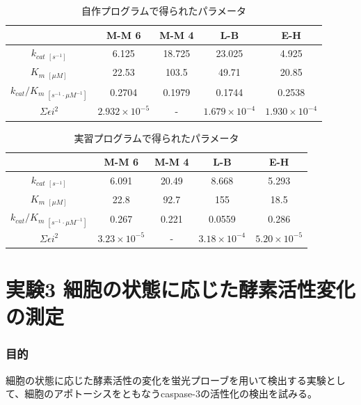 \documentclass[a4paper,papersize,dvipdfmx]{jsarticle}
\begin{document}
\begin{table}[H]
\begin{center}
\begin{tabular}{|c|c|c|c|c|}
\hline
& M-M 6     & M-M 4     & L-B       & E-H       \\ \hline
$k_{cat} \ _{[s^{-1}]}$ & 6.125 & 18.725 & 23.025 & 4.925 \\ \hline
$K_m \ _{[\mu M]}$ & 22.53 & 103.5 & 49.71 & 20.85 \\ \hline
$k_{cat}/K_m \ _{[s^{-1} \cdot \mu M^{-1}]}$   & 0.2704 & 0.1979 & 0.1744 & 0.2538 \\ \hline
$\Sigma \epsilon i^2$    & $2.932 \times 10^{-5}$ & - & $1.679 \times 10^{-4}$ & $1.930 \times 10^{-4}$ \\ \hline
\end{tabular}
\caption{自作プログラムで得られたパラメータ}
\end{center}
\end{table}

\begin{table}[H]
\begin{center}
\begin{tabular}{|c|c|c|c|c|}
\hline
& M-M 6     & M-M 4     & L-B       & E-H       \\ \hline
$k_{cat} \ _{[s^{-1}]}$ & 6.091 & 20.49 & 8.668 & 5.293 \\ \hline
$K_m \ _{[\mu M]}$ & 22.8 & 92.7 & 155 & 18.5 \\ \hline
$k_{cat}/K_m \ _{[s^{-1} \cdot \mu M^{-1}]}$   & 0.267& 0.221 & 0.0559 & 0.286 \\ \hline
$\Sigma \epsilon i^2$    & $3.23 \times 10^{-5}$ & - & $3.18 \times 10^{-4}$ & $5.20 \times 10^{-5}$ \\ \hline
\end{tabular}
\caption{実習プログラムで得られたパラメータ}
\end{center}
\end{table}




\part*{実験3 細胞の状態に応じた酵素活性変化の測定}

\section*{目的}
細胞の状態に応じた酵素活性の変化を蛍光プローブを用いて検出する実験として、細胞のアポトーシスをともなうcaspase-3の活性化の検出を試みる。
\end{document}
